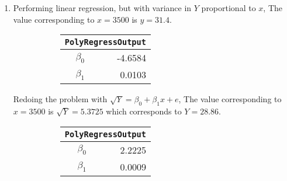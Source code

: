 \begin{enumerate}
\item Performing linear regression, but with variance in $ Y $ proportional to $ x $,
The value corresponding to $ x = 3500 $ is $ y = 31.4 $.

\begin{figure}[H]
	\begin{subfigure}[]{0.2\linewidth}
		\centering
		\begin{tabular}{@{}rr@{}}
			\toprule
			\multicolumn{2}{c}{\texttt{PolyRegressOutput}} \\
			\midrule
			$\beta_0$ &          -4.6584 \\
			$\beta_1$ &           0.0103 \\
			\bottomrule
		\end{tabular}
		
	\end{subfigure}
	\begin{subfigure}[]{0.8\linewidth}
		\centering
		
	\end{subfigure}
\end{figure}

Redoing the problem with $ \sqrt{Y} = \beta_0 + \beta_1 x + e $,
The value corresponding to $ x = 3500 $ is $ \sqrt{Y} = 5.3725 $ which corresponds to $ Y = 28.86 $.

\begin{figure}[H]
	\begin{subfigure}[]{0.2\linewidth}
		\centering
		\begin{tabular}{@{}rr@{}}
			\toprule
			\multicolumn{2}{c}{\texttt{PolyRegressOutput}} \\
			\midrule
			$\beta_0$ &           2.2225 \\
			$\beta_1$ &           0.0009 \\
			\bottomrule
		\end{tabular}
		

\end{subfigure}
\end{figure}
\end{enumerate}
